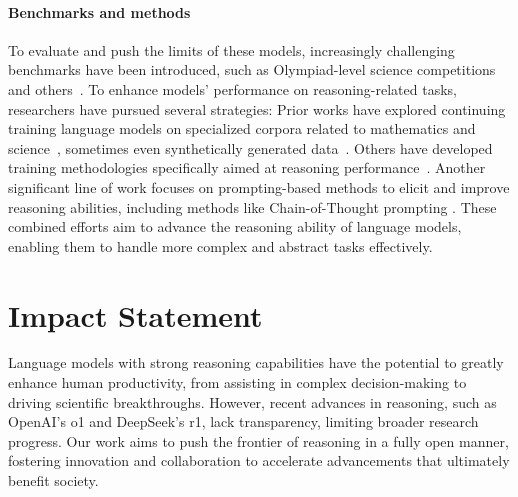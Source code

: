 \documentclass{article}
\theoremstyle{plain}
\theoremstyle{definition}
\theoremstyle{remark}
\begin{document}
\paragraph{Benchmarks and methods} To evaluate and push the limits of these models, increasingly challenging benchmarks have been introduced, such as Olympiad-level science competitions~\cite{he2024olympiadbenchchallengingbenchmarkpromoting,jain2024livecodebenchholisticcontaminationfree,zhong2023agievalhumancentricbenchmarkevaluating} and others~\citep{srivastava2023imitation,glazer2024frontiermathbenchmarkevaluatingadvanced,su2024brightrealisticchallengingbenchmark,kim2024llmasaninterviewerstatictestingdynamic,phan2025humanity}. To enhance models' performance on reasoning-related tasks, researchers have pursued several strategies: Prior works have explored continuing training language models on specialized corpora related to mathematics and science~\citep{azerbayev2023llemma, yang2024syntheticcontinuedpretraining}, sometimes even synthetically generated data~\citep{yu2023metamath}. Others have developed training methodologies specifically aimed at reasoning performance~\citep{zelikman2022starbootstrappingreasoningreasoning,zelikman2024quietstarlanguagemodelsteach,luo2025wizardmathempoweringmathematicalreasoning,yuan2025agentrtraininglanguagemodel,wu2024thinkingllmsgeneralinstruction}. Another significant line of work focuses on prompting-based methods to elicit and improve reasoning abilities, including methods like Chain-of-Thought prompting \citep{wei2023chainofthoughtpromptingelicitsreasoning,yao2024tree,yao2023reactsynergizingreasoningacting,bi2024program,fu2022complexity, zhang2023cumulative,xiang20252reasoningllmslearning,hu2024visual, diao2024activepromptingchainofthoughtlarge}. These combined efforts aim to advance the reasoning ability of language models, enabling them to handle more complex and abstract tasks effectively.



\section*{Impact Statement}

Language models with strong reasoning capabilities have the potential to greatly enhance human productivity, from assisting in complex decision-making to driving scientific breakthroughs. However, recent advances in reasoning, such as OpenAI's o1 and DeepSeek's r1, lack transparency, limiting broader research progress. Our work aims to push the frontier of reasoning in a fully open manner, fostering innovation and collaboration to accelerate advancements that ultimately benefit society.
\end{document}
